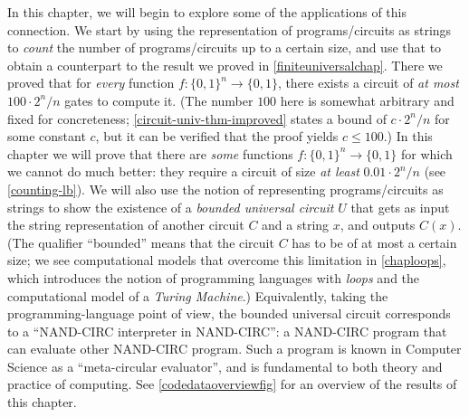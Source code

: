 In this chapter, we will begin to explore some of the applications of
this connection. We start by using the representation of
programs/circuits as strings to \emph{count} the number of
programs/circuits up to a certain size, and use that to obtain a
counterpart to the result we proved in \cref{finiteuniversalchap}. There
we proved that for \emph{every} function
\(f:\{0,1\}^n \rightarrow \{0,1\}\), there exists a circuit of \emph{at
most} \(100 \cdot 2^n / n\) gates to compute it. (The number \(100\)
here is somewhat arbitrary and fixed for concreteness;
\cref{circuit-univ-thm-improved} states a bound of \(c \cdot 2^n /n\)
for some constant \(c\), but it can be verified that the proof yields
\(c \leq 100\).) In this chapter we will prove that there are
\emph{some} functions \(f:\{0,1\}^n \rightarrow \{0,1\}\) for which we
cannot do much better: they require a circuit of size \emph{at least}
\(0.01 \cdot 2^n / n\) (see \cref{counting-lb}). We will also use the
notion of representing programs/circuits as strings to show the
existence of a \emph{bounded universal circuit} \(U\) that gets as input
the string representation of another circuit \(C\) and a string \(x\),
and outputs \(C(x)\). (The qualifier ``bounded'' means that the circuit
\(C\) has to be of at most a certain size; we see computational models
that overcome this limitation in \cref{chaploops}, which introduces the
notion of programming languages with \emph{loops} and the computational
model of a \emph{Turing Machine}.) Equivalently, taking the
programming-language point of view, the bounded universal circuit
corresponds to a ``NAND-CIRC interpreter in NAND-CIRC'': a NAND-CIRC
program that can evaluate other NAND-CIRC program. Such a program is
known in Computer Science as a ``meta-circular evaluator'', and is
fundamental to both theory and practice of computing. See
\cref{codedataoverviewfig} for an overview of the results of this
chapter.


